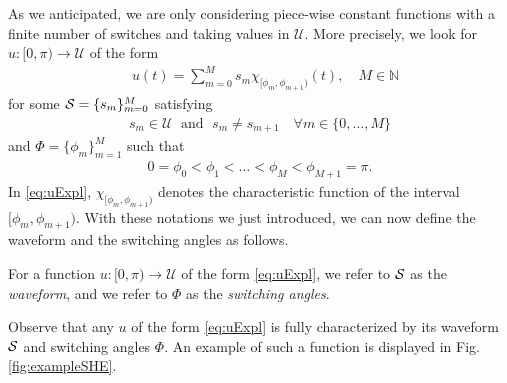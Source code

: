 \documentclass[twocolumn]{autart}    %
\begin{document}
As we anticipated,  we are only considering piece-wise constant functions with a finite number of switches and taking values in $\mathcal{U}$.
More precisely, we look for $u: [0,\pi)\to \mathcal{U}$ of the form
\begin{align}\label{eq:uExpl}
	&u (t)= \sum_{m=0}^M s_m\chi_{[\phi_m,\phi_{m+1})} (t), \quad M\in\mathbb{N} 
\end{align}
for some $\mathcal{S} = \{ s_m\}_{m=0}^M$ satisfying
\begin{align*}
	s_m\in \mathcal{U} \; \text{ and } \; s_m\neq s_{m+1} \quad \forall m\in \{0,\ldots, M\}
\end{align*}
and $\Phi = \{ \phi_m\}_{m=1}^{M}$ such that
\begin{align*}
	0= \phi_0 < \phi_1 <\ldots < \phi_M < \phi_{M+1} = \pi .
\end{align*}
In \eqref{eq:uExpl}, $\chi_{[\phi_m,\phi_{m+1})}$ denotes the characteristic function of the interval $[\phi_m,\phi_{m+1})$. With these notations we just introduced, we can now define the waveform and the switching angles as follows.

\bigskip

\begin{definition}\label{def: waveform and switching angles}
For a function $u: [0,\pi) \to \mathcal{U}$ of the form \eqref{eq:uExpl}, we refer to $\mathcal{S}$ as the \emph{waveform}, and we refer to $\Phi$ as the \emph{switching angles}.
\end{definition}

Observe that any $u$ of the form \eqref{eq:uExpl} is fully characterized by its waveform $\mathcal{S}$ and switching angles $\Phi$. An example of such a function is displayed in Fig. \ref{fig:exampleSHE}. 
\end{document}
